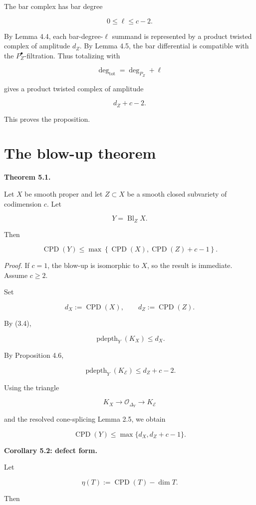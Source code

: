 \documentclass[11pt]{amsart}
\theoremstyle{definition}
\begin{document}
The bar complex has bar degree

\[
0\le \ell\le c-2.
\]

By Lemma 4.4, each bar-degree-$\ell$ summand is represented by a product twisted complex of amplitude $d_Z$. By Lemma 4.5, the bar differential is compatible with the $P_Z^\bullet$-filtration. Thus totalizing with

\[
\deg_{\mathrm{tot}}=\deg_{P_Z}+\ell
\]

gives a product twisted complex of amplitude

\[
d_Z+c-2.
\]

This proves the proposition.

\section{The blow-up theorem}

\noindent\textbf{Theorem 5.1.}

Let $X$ be smooth proper and let $Z\subset X$ be a smooth closed subvariety of codimension $c$. Let

\[
Y=\operatorname{Bl}_ZX.
\]

Then

\[
\operatorname{CPD}(Y)
\le
\max\left\{
\operatorname{CPD}(X),
\operatorname{CPD}(Z)+c-1
\right\}.
\]

\noindent\emph{Proof.} If $c=1$, the blow-up is isomorphic to $X$, so the result is immediate. Assume $c\ge2$.

Set

\[
d_X:=\operatorname{CPD}(X),
\qquad
d_Z:=\operatorname{CPD}(Z).
\]

By (3.4),

\[
\operatorname{pdepth}_Y(K_X)\le d_X.
\]

By Proposition 4.6,

\[
\operatorname{pdepth}_Y(K_{\mathcal E})\le d_Z+c-2.
\]

Using the triangle

\[
K_X\longrightarrow \mathcal O_{\Delta_Y}\longrightarrow K_{\mathcal E}
\]

and the resolved cone-splicing Lemma 2.5, we obtain

\[
\operatorname{CPD}(Y)
\le
\max\{d_X,d_Z+c-1\}.
\]

\noindent\textbf{Corollary 5.2: defect form.}

Let

\[
\eta(T):=\operatorname{CPD}(T)-\dim T.
\]

Then
\end{document}
